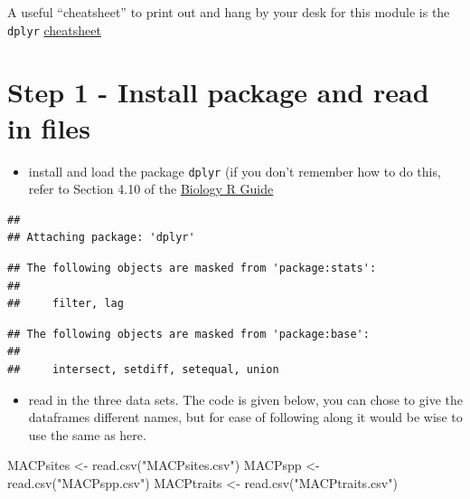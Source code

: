\documentclass[
]{book}
\newenvironment{Shaded}{\begin{snugshade}}{\end{snugshade}}
\newcommand{\FunctionTok}[1]{\textcolor[rgb]{0.00,0.00,0.00}{#1}}
\newcommand{\NormalTok}[1]{#1}
\newcommand{\OtherTok}[1]{\textcolor[rgb]{0.56,0.35,0.01}{#1}}
\newcommand{\StringTok}[1]{\textcolor[rgb]{0.31,0.60,0.02}{#1}}
\providecommand{\tightlist}{%
  \setlength{\itemsep}{0pt}\setlength{\parskip}{0pt}}
\begin{document}
A useful ``cheatsheet'' to print out and hang by your desk for this module is the \texttt{dplyr} \href{https://rstudio.com/wp-content/uploads/2015/02/data-wrangling-cheatsheet.pdf}{cheatsheet}

\hypertarget{step-1---install-package-and-read-in-files}{%
\section{Step 1 - Install package and read in files}\label{step-1---install-package-and-read-in-files}}

\begin{itemize}
\tightlist
\item
  install and load the package \texttt{dplyr} (if you don't remember how to do this, refer to Section 4.10 of the \href{https://ahurford.github.io/quant-guide-all-courses/rintro.html\#r-packages}{Biology R Guide}
\end{itemize}

\begin{verbatim}
## 
## Attaching package: 'dplyr'
\end{verbatim}

\begin{verbatim}
## The following objects are masked from 'package:stats':
## 
##     filter, lag
\end{verbatim}

\begin{verbatim}
## The following objects are masked from 'package:base':
## 
##     intersect, setdiff, setequal, union
\end{verbatim}

\begin{itemize}
\tightlist
\item
  read in the three data sets. The code is given below, you can chose to give the dataframes different names, but for ease of following along it would be wise to use the same as here.
\end{itemize}

\begin{Shaded}
\begin{Highlighting}[]
\NormalTok{MACPsites }\OtherTok{\textless{}{-}} \FunctionTok{read.csv}\NormalTok{(}\StringTok{"MACPsites.csv"}\NormalTok{)}
\NormalTok{MACPspp }\OtherTok{\textless{}{-}} \FunctionTok{read.csv}\NormalTok{(}\StringTok{"MACPspp.csv"}\NormalTok{)}
\NormalTok{MACPtraits }\OtherTok{\textless{}{-}} \FunctionTok{read.csv}\NormalTok{(}\StringTok{"MACPtraits.csv"}\NormalTok{)}
\end{Highlighting}
\end{Shaded}
\end{document}
